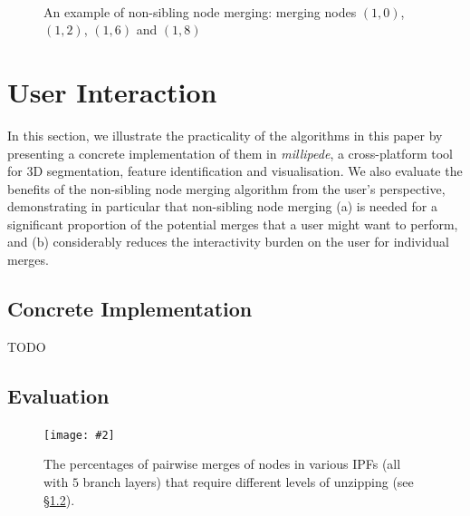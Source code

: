 \documentclass[10pt,twocolumn,twoside]{IEEEtran}
\newcommand{\stufigexx}[5]				%
{
	\begin{figure}[#5]
	\begin{center}
		\texttt{[image: \#2]}
		\caption{#3}
		\label{#4}
	\end{center}
	\end{figure}
}
\newenvironment{stusubfig}[1]
{
	\begin{figure}[#1]
	\begin{center}
}
{
	\end{center}
	\end{figure}
}
\begin{document}
\begin{stusubfig}{p}
	\\
\caption{An example of non-sibling node merging: merging nodes $(1,0)$, $(1,2)$, $(1,6)$ and $(1,8)$}
\label{fig:ipfs-forest-nonsiblingnodemerging}
\end{stusubfig}

\section{User Interaction}
\label{sec:ui}

In this section, we illustrate the practicality of the algorithms in this paper by presenting a concrete implementation of them in \emph{millipede}, a cross-platform tool for 3D segmentation, feature identification and visualisation. We also evaluate the benefits of the non-sibling node merging algorithm from the user's perspective, demonstrating in particular that non-sibling node merging (a) is needed for a significant proportion of the potential merges that a user might want to perform, and (b) considerably reduces the interactivity burden on the user for individual merges.

\subsection{Concrete Implementation}

TODO

\subsection{Evaluation}
\label{subsec:ui-evaluation}

\stufigexx{width=.6\linewidth}{pairwisenodemerges.png}{The percentages of pairwise merges of nodes in various IPFs (all with $5$ branch layers) that require different levels of unzipping (see \S\ref{subsec:ui-evaluation}).}{fig:pairwisenodemerges}{p}
\end{document}
